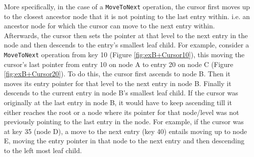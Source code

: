 More specifically, in the case of a \texttt{MoveToNext} operation, the cursor first moves up to the closest ancestor node that it is not pointing to the last entry within. i.e. an ancestor node for which the cursor can move to the next entry within. Afterwards, the cursor then sets the pointer at that level to the next entry in the node and then descends to the entry's smallest leaf child. For example, consider a \texttt{MoveToNext} operation from key 10 (Figure \ref{fig:exB+Cursor10}), this moving the cursor's last pointer from entry 10 on node A to entry 20 on node C (Figure \ref{fig:exB+Cursor20}). To do this, the cursor first ascends to node B. Then it moves its entry pointer for that level to the next entry in node B. Finally it descends to the current entry in node B's smallest leaf child. If the cursor was originally at the last entry in node B, it would have to keep ascending till it either reaches the root or a node where its pointer for that node/level was not previously pointing to the last entry in the node. For example, if the cursor was at key 35 (node D), a move to the next entry (key 40) entails moving up to node E, moving the entry pointer in that node to the next entry and then descending to the left most leaf child.

